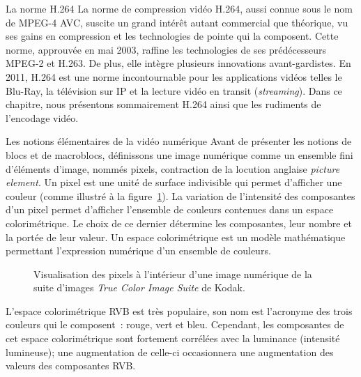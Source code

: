 \documentclass[letterpaper, twoside, 12pt,memoire]{thETS}
\newcommand{\LT}[1]{%
	{
	\todo[inline,color={red!33!green!33!blue!33}]{%
	\textbf{[LT]:}~#1}
	}}
\newcommand{\fig}[1]{figure~\ref{#1}}
\begin{document}
\begin{chapter}{La norme H.264}
\LT{Traduire les images en francais (plus tard)}
La norme de compression vidéo H.264, aussi connue sous le nom
de MPEG-4 AVC, suscite un grand intérêt autant commercial que théorique, vu ses
gains en compression et les technologies de pointe qui la composent. Cette
norme, approuvée en mai 2003, raffine les technologies de ses prédécesseurs
MPEG-2 et H.263. De plus, elle intègre plusieurs innovations avant-gardistes. En
2011, H.264 est une norme incontournable pour les applications vidéos telles le
Blu-Ray, la télévision sur IP et la lecture vidéo en transit
(\textit{streaming}). Dans ce chapitre, nous présentons sommairement H.264 ainsi
que les rudiments de l'encodage vidéo.

\begin{section}{Les notions élémentaires de la vidéo numérique}
Avant de présenter les notions de blocs et de macroblocs, définissons une image
numérique comme un ensemble fini d'éléments d'image, nommés pixels, contraction
de la locution anglaise \textit{picture element}. Un pixel est une unité de
surface indivisible qui permet d'afficher une couleur (comme illustré à la
\fig{fig-PixelLighthouse}). La variation de l'intensité des composantes d'un
pixel permet d'afficher l'ensemble de couleurs contenues dans un espace
colorimétrique. Le choix de ce dernier détermine les composantes, leur nombre et
la portée de leur valeur. Un espace colorimétrique est un modèle mathématique
permettant l'expression numérique d'un ensemble de couleurs.

\begin{figure}[htb]
\centering
{}
\caption{Visualisation des pixels à l'intérieur d'une image numérique de la
suite d'images \textit{True Color Image Suite} de Kodak.}
\label{fig-PixelLighthouse}
\end{figure}

L'espace colorimétrique RVB est très populaire, son nom est l'acronyme des trois
couleurs qui le composent~: rouge, vert et bleu. Cependant, les composantes de
cet espace colorimétrique sont fortement corrélées avec la luminance
(intensité lumineuse); une augmentation de celle-ci occasionnera une
augmentation des valeurs des composantes RVB.


\end{section}
\end{chapter}
\end{document}
